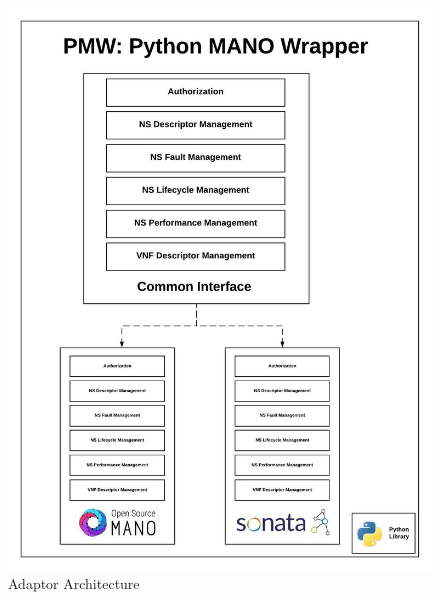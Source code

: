\begin{frame}
\begin{figure}
	\centering
	\includegraphics[width=0.6\linewidth]{images/WrapperArch}
	{\\Adaptor Architecture}
	\label{fig:wrapperarch}
\end{figure}




\end{frame}
